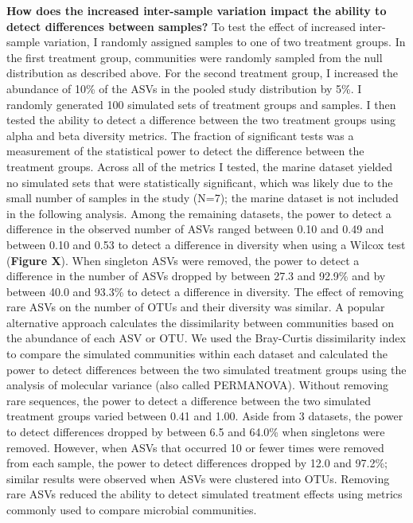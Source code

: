 \documentclass[]{article}
\begin{document}
\textbf{How does the increased inter-sample variation impact the ability
to detect differences between samples?} To test the effect of increased
inter-sample variation, I randomly assigned samples to one of two
treatment groups. In the first treatment group, communities were
randomly sampled from the null distribution as described above. For the
second treatment group, I increased the abundance of 10\% of the ASVs in
the pooled study distribution by 5\%. I randomly generated 100 simulated
sets of treatment groups and samples. I then tested the ability to
detect a difference between the two treatment groups using alpha and
beta diversity metrics. The fraction of significant tests was a
measurement of the statistical power to detect the difference between
the treatment groups. Across all of the metrics I tested, the marine
dataset yielded no simulated sets that were statistically significant,
which was likely due to the small number of samples in the study (N=7);
the marine dataset is not included in the following analysis. Among the
remaining datasets, the power to detect a difference in the observed
number of ASVs ranged between 0.10 and 0.49 and between 0.10 and 0.53 to
detect a difference in diversity when using a Wilcox test
(\textbf{Figure X}). When singleton ASVs were removed, the power to
detect a difference in the number of ASVs dropped by between 27.3 and
92.9\% and by between 40.0 and 93.3\% to detect a difference in
diversity. The effect of removing rare ASVs on the number of OTUs and
their diversity was similar. A popular alternative approach calculates
the dissimilarity between communities based on the abundance of each ASV
or OTU. We used the Bray-Curtis dissimilarity index to compare the
simulated communities within each dataset and calculated the power to
detect differences between the two simulated treatment groups using the
analysis of molecular variance (also called PERMANOVA). Without removing
rare sequences, the power to detect a difference between the two
simulated treatment groups varied between 0.41 and 1.00. Aside from 3
datasets, the power to detect differences dropped by between 6.5 and
64.0\% when singletons were removed. However, when ASVs that occurred 10
or fewer times were removed from each sample, the power to detect
differences dropped by 12.0 and 97.2\%; similar results were observed
when ASVs were clustered into OTUs. Removing rare ASVs reduced the
ability to detect simulated treatment effects using metrics commonly
used to compare microbial communities.
\end{document}
